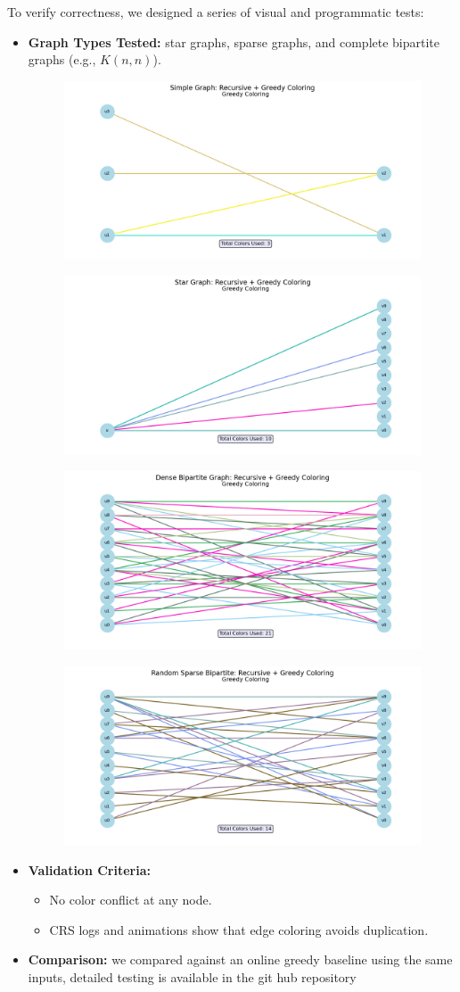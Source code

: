 \documentclass[11pt]{article}
\begin{document}
To verify correctness, we designed a series of visual and programmatic tests:
\begin{itemize}
  \item \textbf{Graph Types Tested:} star graphs, sparse graphs, and complete bipartite graphs (e.g., $K(n, n)$).
  \begin{figure}[H]
      \centering
      \includegraphics[width=0.5\linewidth]{Figure_1.png}
  \end{figure}
\begin{figure}[H]
      \centering
      \includegraphics[width=0.5\linewidth]{Figure_2.png}
  \end{figure}
\begin{figure}[H]
        \centering
        \includegraphics[width=0.5\linewidth]{Figure_3.png}
    \end{figure}
\begin{figure}
            \centering
            \includegraphics[width=0.5\linewidth]{Figure_4.png}
        \end{figure}
                \item \textbf{Validation Criteria:}
    \begin{itemize}
      \item No color conflict at any node.
      \item CRS logs and animations show that edge coloring avoids duplication.
    \end{itemize}
  \item \textbf{Comparison:} we compared against an online greedy baseline using the same inputs, detailed testing is available in the git hub repository
\end{itemize}
\end{document}
